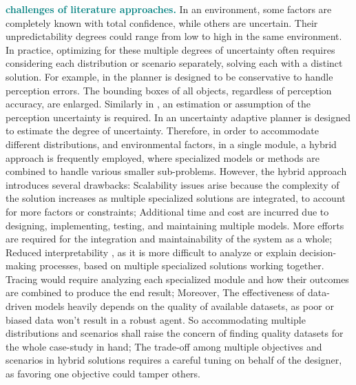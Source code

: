 \textcolor{teal}{\textbf{challenges of literature approaches.}} In an environment, some factors are completely known with total confidence, while others are uncertain. Their unpredictability degrees could range from low to high in the same environment. In practice, optimizing for these multiple degrees of uncertainty often requires considering each distribution or scenario separately, solving each with a distinct solution. For example, in \cite{OnboardMitigation_2} the planner is designed to be conservative to handle perception errors. The bounding boxes of all objects, regardless of perception accuracy, are enlarged. Similarly in \cite{OnboardMitigation_3}, an estimation or assumption of the perception uncertainty is required. In \cite{OnboardMitigation_4} an uncertainty adaptive planner is designed to estimate the degree of uncertainty. Therefore, in order to accommodate different distributions, and environmental factors, in a single module, a hybrid approach is frequently employed, where specialized models or methods are combined to handle various smaller sub-problems. However, the hybrid approach introduces several drawbacks: Scalability issues arise \cite{scalabilityML} because the complexity of the solution increases as multiple specialized solutions are integrated, to account for more factors or constraints; Additional time and cost are incurred due to designing, implementing, testing, and maintaining multiple models. More efforts are required for the integration and maintainability of the system as a whole; Reduced interpretability \cite{UncertainSurvey}, as it is more difficult to analyze or explain decision-making processes, based on multiple specialized solutions working together. Tracing would require analyzing each specialized module and how their outcomes are combined to produce the end result; Moreover, The effectiveness of data-driven models heavily depends on the quality of available datasets, as poor or biased data won't result in a robust agent. So accommodating multiple distributions and scenarios shall raise the concern of finding quality datasets for the whole case-study in hand; The trade-off among multiple objectives and scenarios in hybrid solutions requires a careful tuning on behalf of the designer, as favoring one objective could tamper others.

